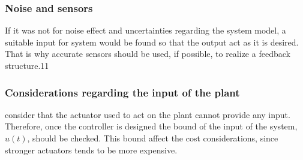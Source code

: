 \subsubsection{Noise and sensors}
If it was not for noise effect and uncertainties regarding the system model, a suitable input for system would be found so that the output act as it is desired. That is why accurate sensors should be used, if possible, to realize a feedback structure.11


\subsubsection{Considerations regarding the input of the plant}
consider that the actuator used to act on the plant cannot provide any input. Therefore, once the controller is designed the bound of the input of the system, \(u(t)\), should be checked. This bound affect the cost considerations, since stronger actuators tends to be more expensive.
